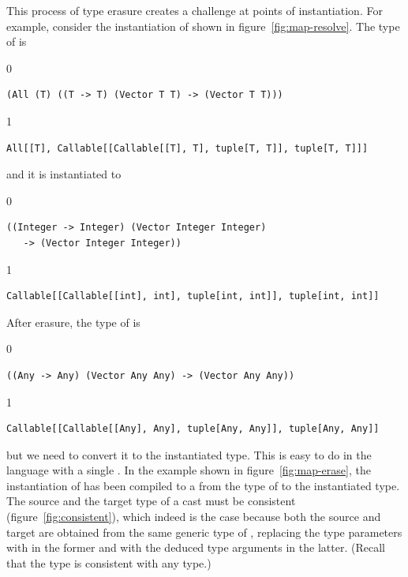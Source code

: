 \documentclass[7x10]{TimesAPriori_MIT}%
\def\racketEd{0}
\def\pythonEd{1}
\def\edition{1}
\newcommand{\pythonColor}[0]{}
\numberwithin{theorem}{chapter}
\numberwithin{definition}{chapter}
\numberwithin{equation}{chapter}
\begin{document}
This process of type erasure creates a challenge at points of
instantiation. For example, consider the instantiation of
 shown in figure~\ref{fig:map-resolve}.
The type of  is
%
{\if\edition\racketEd    
\begin{lstlisting}
(All (T) ((T -> T) (Vector T T) -> (Vector T T)))
\end{lstlisting}
\fi}
{\if\edition\pythonEd\pythonColor    
\begin{lstlisting}
All[[T], Callable[[Callable[[T], T], tuple[T, T]], tuple[T, T]]]
\end{lstlisting}
\fi}
%
\noindent and it is instantiated to 
%
{\if\edition\racketEd
\begin{lstlisting}
((Integer -> Integer) (Vector Integer Integer)
   -> (Vector Integer Integer))
\end{lstlisting}
\fi}
{\if\edition\pythonEd\pythonColor
\begin{lstlisting}
Callable[[Callable[[int], int], tuple[int, int]], tuple[int, int]]
\end{lstlisting}
\fi}
%
\noindent After erasure, the type of  is
%
{\if\edition\racketEd
\begin{lstlisting}
((Any -> Any) (Vector Any Any) -> (Vector Any Any))
\end{lstlisting}
\fi}
{\if\edition\pythonEd\pythonColor
\begin{lstlisting}
Callable[[Callable[[Any], Any], tuple[Any, Any]], tuple[Any, Any]]
\end{lstlisting}
\fi}
%
\noindent but we need to convert it to the instantiated type.  This is
easy to do in the language \LangCast{} with a single .  In
the example shown in figure~\ref{fig:map-erase}, the instantiation of
 has been compiled to a  from the type of
 to the instantiated type. The source and the target type of
a cast must be consistent (figure~\ref{fig:consistent}), which indeed
is the case because both the source and target are obtained from the
same generic type of , replacing the type parameters with
\CANYTY{} in the former and with the deduced type arguments in the
latter. (Recall that the \CANYTY{} type is consistent with any type.)
\end{document}
